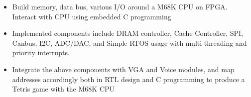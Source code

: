 \documentclass[10pt,a4paper,ragged2e,withhyper]{altacv}
\begin{document}
\begin{paracol}{2}
\divider

\begin{itemize}
\item Build {memory, data bus, various I/O} around a M68K CPU on FPGA. Interact with CPU using embedded C programming
\item Implemented components include {DRAM controller, Cache Controller, SPI, Canbus, I2C, ADC/DAC}, and {Simple RTOS} usage with multi-threading and priority interrupts.
\item Integrate the above components with VGA and Voice modules, and map addresses accordingly both in RTL design and C programming to produce a Tetris game with the M68K CPU
\end{itemize}



\medskip







\end{paracol}
\end{document}
